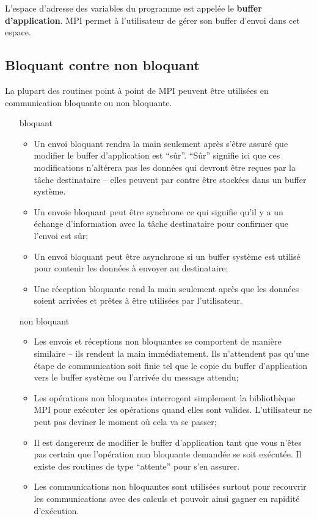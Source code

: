 \documentclass[11pt,a4paper]{article}
\begin{document}
L'espace d'adresse des variables du programme est appelée le \textbf{buffer d'application}. MPI permet à l'utilisateur de gérer son
buffer d'envoi dans cet espace.

\subsection{Bloquant contre non bloquant}

La plupart des routines point à point de MPI peuvent être utilisées en communication bloquante ou non bloquante. 

\begin{itemize}
\item[bloquant]
  \begin{itemize}
  \item Un envoi bloquant rendra la main seulement après s'être assuré que modifier le buffer d'application est ``sûr''.
``Sûr'' signifie ici que ces modifications n'altérera pas les données qui devront être reçues par la tâche destinataire -- elles peuvent
par contre être stockées dans un buffer système.
\item Un envoie bloquant peut être synchrone ce qui signifie qu'il y a un échange d'information avec la tâche destinataire pour
confirmer que l'envoi est sûr;
\item Un envoi bloquant peut être asynchrone si un buffer système est utilisé pour contenir les données à envoyer au destinataire;
\item Une réception bloquante rend la main seulement après que les données soient arrivées et prêtes à être utilisées par
l'utilisateur.
  \end{itemize}
\item[non bloquant]
\begin{itemize}
\item Les envois et réceptions non bloquantes se comportent de manière similaire -- ils rendent la main immédiatement. Ils n'attendent pas
qu'une étape de communication soit finie tel que le copie du buffer d'application vers le buffer système ou l'arrivée du message attendu;
\item Les opérations non bloquantes interrogent simplement la bibliothèque MPI pour exécuter les opérations quand elles sont valides. L'utilisateur
ne peut pas deviner le moment où cela va se passer;
\item Il est dangereux de modifier le buffer d'application tant que vous n'êtes pas certain que l'opération non bloquante demandée se soit
exécutée. Il existe des routines de type ``attente'' pour s'en assurer.
\item Les communications non bloquantes sont utilisées surtout pour recouvrir les communications avec des calculs et pouvoir ainsi gagner
en rapidité d'exécution.
\end{itemize}
\end{itemize}
\end{document}
